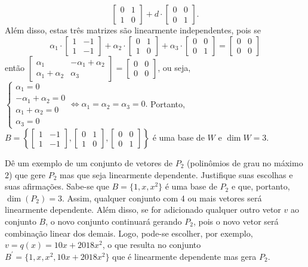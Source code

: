 \documentclass[12pt,a4paper]{article}
\begin{document}
\begin{ExerciseList}
\[\begin{bmatrix}
0 & 1 \\
1 & 0
\end{bmatrix}
+d\cdot
\begin{bmatrix}
0 & 0 \\
0 & 1
\end{bmatrix}.
\]
Além disso, estas três matrizes são linearmente independentes, pois se
\[
\alpha_1 \cdot
\begin{bmatrix}
1 & -1 \\
1 & -1
\end{bmatrix}
+\alpha_2 \cdot
\begin{bmatrix}
0 & 1 \\
1 & 0
\end{bmatrix}
+\alpha_3\cdot
\begin{bmatrix}
0 & 0 \\
0 & 1
\end{bmatrix}
=\begin{bmatrix}
0 & 0 \\
0 & 0
\end{bmatrix}
\]
então $\begin{bmatrix}
\alpha_1 & -\alpha_1+\alpha_2 \\
\alpha_1+\alpha_2 & \alpha_3
\end{bmatrix}
=\begin{bmatrix}
0 & 0 \\
0 & 0
\end{bmatrix}$, ou seja,
$
\begin{cases}
 \alpha_1 = 0\\
-\alpha_1+\alpha_2 =0\\
 \alpha_1+\alpha_2=0\\
 \alpha_3=0
\end{cases}
\Leftrightarrow
\alpha_1 = \alpha_2 = \alpha_3 = 0.
$
Portanto, $B = \left\{
\begin{bmatrix}
1 & -1 \\
1 & -1
\end{bmatrix},
\begin{bmatrix}
0 & 1 \\
1 & 0
\end{bmatrix},
\begin{bmatrix}
0 & 0 \\
0 & 1
\end{bmatrix}
\right\}$ é uma base de $W$ e $\dim W = 3$.

\Exercise[title={2,0}] Dê um exemplo de um conjunto de vetores de $P_2$ (polinômios de grau no máximo $2$) que gere $P_2$ mas que seja linearmente dependente. Justifique suas escolhas e suas afirmações.
\Answer
Sabe-se que $B = \{1, x, x^2\}$ é uma base de $P_2$ e que, portanto, $\dim(P_2) = 3$. Assim, qualquer conjunto com 4 ou mais vetores será linearmente dependente. Além disso, se for adicionado qualquer outro vetor $v$ ao conjunto $B$, o novo conjunto continuará gerando $P_2$, pois o novo vetor será combinação linear dos demais. Logo, pode-se escolher, por exemplo, $v = q(x) = 10x + 2018x^2$, o que resulta no conjunto $B^\prime = \{1, x, x^2, 10x + 2018x^2\}$ que é linearmente dependente mas gera $P_2$.



\end{ExerciseList}
\end{document}
